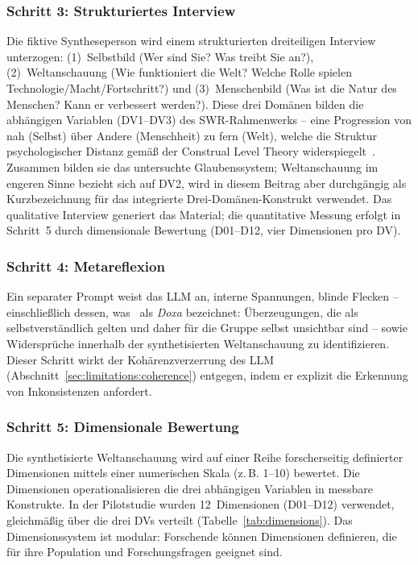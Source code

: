\documentclass[11pt,a4paper]{article}
\begin{document}
\subsubsection{Schritt 3: Strukturiertes Interview}

Die fiktive Syntheseperson wird einem strukturierten dreiteiligen Interview unterzogen: (1)~Selbstbild (\glqq{}Wer sind Sie? Was treibt Sie an?\grqq{}), (2)~Weltanschauung (\glqq{}Wie funktioniert die Welt? Welche Rolle spielen Technologie/Macht/Fortschritt?\grqq{}) und (3)~Menschenbild (\glqq{}Was ist die Natur des Menschen? Kann er verbessert werden?\grqq{}). Diese drei Domänen bilden die abhängigen Variablen (DV1--DV3) des SWR-Rahmenwerks -- eine Progression von nah (Selbst) über Andere (Menschheit) zu fern (Welt), welche die Struktur psychologischer Distanz gemäß der Construal Level Theory widerspiegelt~\citep{TropeLiberman2010}. Zusammen bilden sie das untersuchte Glaubenssystem; \glqq{}Weltanschauung\grqq{} im engeren Sinne bezieht sich auf DV2, wird in diesem Beitrag aber durchgängig als Kurzbezeichnung für das integrierte Drei-Domänen-Konstrukt verwendet. Das qualitative Interview generiert das Material; die quantitative Messung erfolgt in Schritt~5 durch dimensionale Bewertung (D01--D12, vier Dimensionen pro DV).

\subsubsection{Schritt 4: Metareflexion}

Ein separater Prompt weist das LLM an, interne Spannungen, blinde Flecken -- einschließlich dessen, was~\citet{Bourdieu1977} als \emph{Doxa} bezeichnet: Überzeugungen, die als selbstverständlich gelten und daher für die Gruppe selbst unsichtbar sind -- sowie Widersprüche innerhalb der synthetisierten Weltanschauung zu identifizieren. Dieser Schritt wirkt der Kohärenzverzerrung des LLM (Abschnitt~\ref{sec:limitations:coherence}) entgegen, indem er explizit die Erkennung von Inkonsistenzen anfordert.

\subsubsection{Schritt 5: Dimensionale Bewertung}

Die synthetisierte Weltanschauung wird auf einer Reihe forscherseitig definierter Dimensionen mittels einer numerischen Skala (z.\,B. 1--10) bewertet. Die Dimensionen operationalisieren die drei abhängigen Variablen in messbare Konstrukte. In der Pilotstudie wurden 12~Dimensionen (D01--D12) verwendet, gleichmäßig über die drei DVs verteilt (Tabelle~\ref{tab:dimensions}). Das Dimensionssystem ist modular: Forschende können Dimensionen definieren, die für ihre Population und Forschungsfragen geeignet sind.
\end{document}

